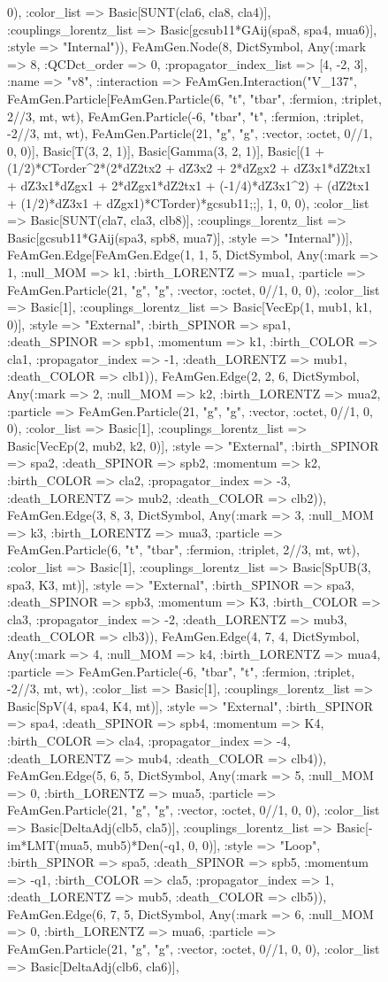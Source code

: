 \documentclass{revtex4}
\begin{document}
\begin{figure}[!htb]
\begin{center}
{0), :color_list => Basic[SUNT(cla6, cla8, cla4)], :couplings_lorentz_list => Basic[gcsub11*GAij(spa8, spa4, mua6)], :style => "Internal")), FeAmGen.Node(8, Dict{Symbol, Any}(:mark => 8, :QCDct_order => 0, :propagator_index_list => [4, -2, 3], :name => "v8", :interaction => FeAmGen.Interaction("V_137", FeAmGen.Particle[FeAmGen.Particle(6, "t", "tbar", :fermion, :triplet, 2//3, mt, wt), FeAmGen.Particle(-6, "tbar", "t", :fermion, :triplet, -2//3, mt, wt), FeAmGen.Particle(21, "g", "g", :vector, :octet, 0//1, 0, 0)], Basic[T(3, 2, 1)], Basic[Gamma(3, 2, 1)], Basic[(1 + (1/2)*CTorder^2*(2*dZ2tx2 + dZ3x2 + 2*dZgx2 + dZ3x1*dZ2tx1 + dZ3x1*dZgx1 + 2*dZgx1*dZ2tx1 + (-1/4)*dZ3x1^2) + (dZ2tx1 + (1/2)*dZ3x1 + dZgx1)*CTorder)*gcsub11;;], 1, 0, 0), :color_list => Basic[SUNT(cla7, cla3, clb8)], :couplings_lorentz_list => Basic[gcsub11*GAij(spa3, spb8, mua7)], :style => "Internal"))], FeAmGen.Edge[FeAmGen.Edge(1, 1, 5, Dict{Symbol, Any}(:mark => 1, :null_MOM => k1, :birth_LORENTZ => mua1, :particle => FeAmGen.Particle(21, "g", "g", :vector, :octet, 0//1, 0, 0), :color_list => Basic[1], :couplings_lorentz_list => Basic[VecEp(1, mub1, k1, 0)], :style => "External", :birth_SPINOR => spa1, :death_SPINOR => spb1, :momentum => k1, :birth_COLOR => cla1, :propagator_index => -1, :death_LORENTZ => mub1, :death_COLOR => clb1)), FeAmGen.Edge(2, 2, 6, Dict{Symbol, Any}(:mark => 2, :null_MOM => k2, :birth_LORENTZ => mua2, :particle => FeAmGen.Particle(21, "g", "g", :vector, :octet, 0//1, 0, 0), :color_list => Basic[1], :couplings_lorentz_list => Basic[VecEp(2, mub2, k2, 0)], :style => "External", :birth_SPINOR => spa2, :death_SPINOR => spb2, :momentum => k2, :birth_COLOR => cla2, :propagator_index => -3, :death_LORENTZ => mub2, :death_COLOR => clb2)), FeAmGen.Edge(3, 8, 3, Dict{Symbol, Any}(:mark => 3, :null_MOM => k3, :birth_LORENTZ => mua3, :particle => FeAmGen.Particle(6, "t", "tbar", :fermion, :triplet, 2//3, mt, wt), :color_list => Basic[1], :couplings_lorentz_list => Basic[SpUB(3, spa3, K3, mt)], :style => "External", :birth_SPINOR => spa3, :death_SPINOR => spb3, :momentum => K3, :birth_COLOR => cla3, :propagator_index => -2, :death_LORENTZ => mub3, :death_COLOR => clb3)), FeAmGen.Edge(4, 7, 4, Dict{Symbol, Any}(:mark => 4, :null_MOM => k4, :birth_LORENTZ => mua4, :particle => FeAmGen.Particle(-6, "tbar", "t", :fermion, :triplet, -2//3, mt, wt), :color_list => Basic[1], :couplings_lorentz_list => Basic[SpV(4, spa4, K4, mt)], :style => "External", :birth_SPINOR => spa4, :death_SPINOR => spb4, :momentum => K4, :birth_COLOR => cla4, :propagator_index => -4, :death_LORENTZ => mub4, :death_COLOR => clb4)), FeAmGen.Edge(5, 6, 5, Dict{Symbol, Any}(:mark => 5, :null_MOM => 0, :birth_LORENTZ => mua5, :particle => FeAmGen.Particle(21, "g", "g", :vector, :octet, 0//1, 0, 0), :color_list => Basic[DeltaAdj(clb5, cla5)], :couplings_lorentz_list => Basic[-im*LMT(mua5, mub5)*Den(-q1, 0, 0)], :style => "Loop", :birth_SPINOR => spa5, :death_SPINOR => spb5, :momentum => -q1, :birth_COLOR => cla5, :propagator_index => 1, :death_LORENTZ => mub5, :death_COLOR => clb5)), FeAmGen.Edge(6, 7, 5, Dict{Symbol, Any}(:mark => 6, :null_MOM => 0, :birth_LORENTZ => mua6, :particle => FeAmGen.Particle(21, "g", "g", :vector, :octet, 0//1, 0, 0), :color_list => Basic[DeltaAdj(clb6, cla6)], }
\end{center}
\end{figure}
\end{document}
